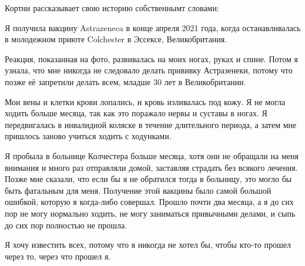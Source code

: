 Кортни рассказывает свою историю собственнымт словами:

Я получила вакцину Astrazeneca в конце апреля 2021 года, когда останавливалась в
молодежном приюте Colchester в Эссексе, Великобритания.

Реакция, показанная на фото, развивалась на моих ногах, руках и спине. Потом я
узнала, что мне никогда не следовало делать прививку Астразенеки, потому что
позже её запретили делать всем, младше 30 лет в Великобритании.

Мои вены и клетки крови лопались, и кровь изливалась под кожу. Я не могла ходить
больше месяца, так как это поражало нервы и суставы в ногах. Я передвигалась в
инвалидной коляске в течение длительного периода, а затем мне пришлось заново
учиться ходить с ходунками.

Я пробыла в больнице Колчестера больше месяца, хотя они не обращали на меня
внимания и много раз отправляли домой, заставляя страдать без всякого
лечения. Позже мне сказали, что если бы я не обратился тогда в больницу, это
могло бы быть фатальным для меня. Получение этой вакцины было самой большой
ошибкой, которую я когда-либо совершал. Прошло почти два месяца, а я до сих пор
не могу нормально ходить, не могу заниматься привычными делами, и сыпь до сих
пор полностью не прошла.

Я хочу известить всех, потому что я никогда не хотел бы, чтобы кто-то прошел
через то, через что прошел я.
